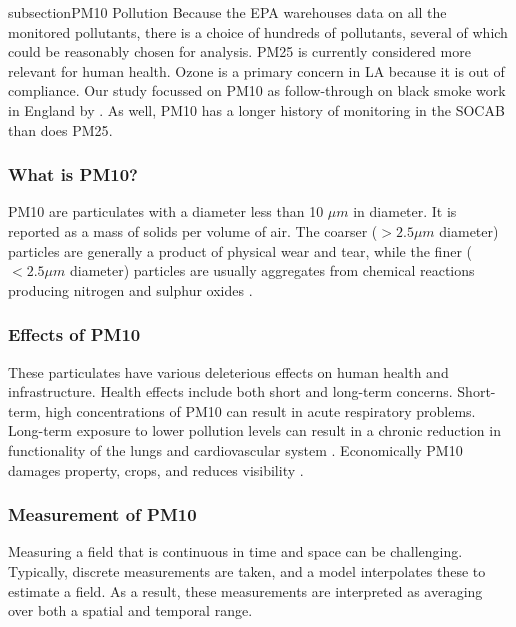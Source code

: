 subsection{PM10 Pollution}
\label{sec:pm10}
Because the \ac{EPA} warehouses data on all the monitored pollutants, there is a choice of hundreds of pollutants, several of which could be reasonably chosen for analysis.  \ac{PM25} is currently considered more relevant for human health.  Ozone is a primary concern in LA because it is out of compliance.   Our study focussed on \ac{PM10} as follow-through on black smoke work in England by \cite{zidek2010monitoring}.  As well, \ac{PM10} has a longer history of monitoring in the \ac{SOCAB} than does \ac{PM25}.

\subsubsection*{What is PM10?}
\label{subsubsec:pm10nature}
\ac{PM10} are particulates with a diameter less than 10 $\mu m$ in diameter.  It is reported as a mass of solids per volume of air.  The coarser ($> 2.5 \mu m$ diameter) particles are generally a product of physical wear and tear, while the finer ($< 2.5 \mu m$ diameter) particles are usually aggregates from chemical reactions producing nitrogen and sulphur oxides
.

\subsubsection*{Effects of PM10}
\label{subsubsec:pm10effects}
These particulates have various deleterious effects on human health and infrastructure.  Health effects include both short and long-term concerns.  Short-term, high concentrations of \ac{PM10} can result in acute respiratory problems.  Long-term exposure to lower pollution levels can result in a chronic reduction in functionality of the lungs and cardiovascular system %
.  Economically \ac{PM10} damages property, crops, and reduces visibility
.

\subsubsection*{Measurement of PM10}
\label{subsubsec:pm10measurement}
Measuring a field that is continuous in time and space can be challenging.  Typically, discrete measurements are taken, and a model interpolates these to estimate a field.  As a result, these measurements are interpreted as averaging over both a spatial and temporal range.

